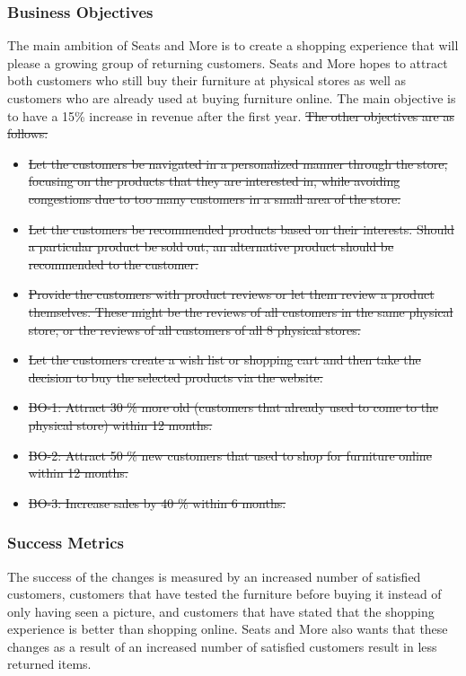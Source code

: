 \documentclass[a4paper]{article}
\begin{document}
\subsubsection*{Business Objectives}
The main ambition of Seats and More is to create a shopping experience that will please a growing group of returning customers. Seats and More hopes to attract both customers who still buy their furniture at physical stores as well as customers who are already used at buying furniture online. The main objective is to have a 15\% increase in revenue after the first year. \sout{The other objectives are as follows:}
\begin{itemize}
\item \sout{Let the customers be navigated in a personalized manner through the store, focusing on the products that they are interested in, while avoiding congestions due to too many customers in a small area of the store.}
\item \sout{Let the customers be recommended products based on their interests. Should a particular product be sold out, an alternative product should be recommended to the customer.}
\item \sout{Provide the customers with product reviews or let them review a product themselves. These might be the reviews of all customers in the same physical store, or the reviews of all customers of all 8 physical stores.}
\item \sout{Let the customers create a wish list or shopping cart and then take the decision to buy the selected products via the website.}
\item \sout{BO-1: Attract 30 \% more old (customers that already used to come to the physical store) within 12 months.}
\item \sout{BO-2: Attract 50 \% new customers that used to shop for furniture online within 12 months.}
\item \sout{BO-3: Increase sales by 40 \% within 6 months.}
\end{itemize}

\subsubsection*{Success Metrics}
The success of the changes is measured by an increased number of satisfied customers, customers that have tested the furniture before buying it instead of only having seen a picture, \color{blue}and customers that have stated that the shopping experience is better than shopping online. \color{black}Seats and More also wants that these changes as a result of an increased number of satisfied customers result in less returned items.
\end{document}
